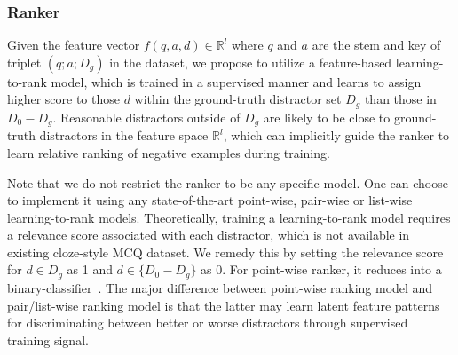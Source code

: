 \subsubsection{Ranker}
\label{sec:AMMR}
Given the feature vector $f(q, a, d)\in \mathbb{R}^l$ where $q$ and 
$a$ are the stem and key of triplet $(q; a; D_g)$ in the dataset, 
we propose to utilize a feature-based learning-to-rank model, 
which is trained in a supervised manner and learns to assign higher
score to those $d$ within the ground-truth distractor set $D_g$ 
than those in $D_0-D_g$. Reasonable distractors outside of $D_g$ are likely to be close to ground-truth distractors in the feature space $\mathbb{R}^l$, which can implicitly guide the ranker to learn relative ranking of negative examples during training.

Note that we do not restrict the ranker to be any specific model. 
One can choose to implement it using any state-of-the-art point-wise, 
pair-wise or list-wise learning-to-rank models. Theoretically, 
training a learning-to-rank model requires a relevance score associated with 
each distractor, which is not available in existing cloze-style 
MCQ dataset. We remedy this by setting the relevance score for $d\in D_g$ as 1 and $d\in \{D_0-D_g\}$ as 0. For point-wise ranker, 
it reduces into a binary-classifier~\cite{liang2018distractor}. 
The major difference between point-wise ranking model and 
pair/list-wise ranking model is that the latter may learn latent 
feature patterns for discriminating between better or worse distractors 
through supervised training signal.

